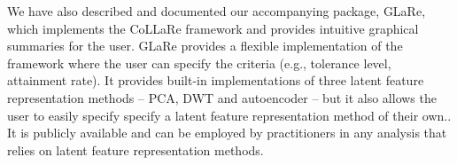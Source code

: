 We have also described and documented our accompanying  package, GLaRe, which implements the CoLLaRe framework and provides intuitive graphical summaries for the user.
GLaRe provides a flexible implementation of the framework where the user can specify the criteria (e.g., tolerance level, attainment rate).
It provides built-in implementations of three latent feature representation methods -- PCA, DWT and autoencoder -- but it also allows the user to easily specify specify a latent feature representation method of their own..
It is publicly available and can be employed by practitioners in any analysis that relies on latent feature representation methods.






